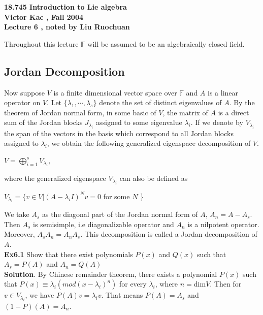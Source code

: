 \documentclass[12pt,a4paper]{article}
\begin{document}
\setlength{\baselineskip}{15pt}
\newtheorem{theorem}{Theorem}
\newtheorem{proposition}{Proposition}
\newtheorem{lemma}{Lemma}
\begin{center}
\textbf{18.745 Introduction to Lie algebra\\
Victor Kac , Fall 2004 \\
Lecture 6 , noted by Liu Ruochuan}
\end{center}

\noindent Throughout this lecture $\mathbb{F}$ will be assumed to
be an algebraically closed field.
\subsection*{Jordan Decomposition}
 Now suppose $V$ is a finite dimensional vector
space over $\mathbb{F}$ and $A$ is a linear operator on $V$. Let
$\{\lambda_{1},\cdots,\lambda_{s}\}$ denote the set of distinct
eigenvalues of $A$. By the theorem of Jordan normal form, in some
basic of $V$, the matrix of $A$ is a direct sum of the Jordan
blocks $J_{\lambda_{i}}$ assigned to some eigenvalue
$\lambda_{i}$. If we denote by $V_{\lambda_{i}}$ the span of the
vectors in the basis which correspond to all Jordan blocks
assigned to $\lambda_{i}$, we obtain the following generalized
eigenspace decomposition of $V$.
\begin{center}
 $V=\bigoplus_{i=1}^{s}V_{\lambda_{i}}$,
\end{center}
where the generalized eigenspace $V_{\lambda_{i}}$ can also be
defined as
\begin{center}
$V_{\lambda_{i}}=\{v\in V|(A-\lambda_{i}I)^{N}v=0$ for some $N$ \}
\end{center}
We take $A_{s}$ as the diagonal part of the Jordan normal form of
$A$, $A_{n}=A-A_{s}$. Then $A_{s}$ is semisimple, i.e
diagonalizable operator and $A_{n}$ is
a nilpotent operator. Moreover, $A_{s}A_{n}=A_{n}A_{s}$. This decomposition is called a Jordan decomposition of $A$. \\

\noindent \textbf{Ex6.1} Show that there exist polynomials $P(x)$
and $Q(x)$ such that $A_{s}=P(A)$ and $A_{n}=Q(A)$\\
\textbf{Solution}. By Chinese remainder theorem, there exists a
polynomial $P(x)$ such that
$P(x)\equiv\lambda_{i}(mod(x-\lambda_{i})^{n})$ for every
$\lambda_{i}$, where $n=$dim$V$. Then for $v\in V_{\lambda_{i}}$,
we have $P(A)v=\lambda_{i}v$. That means $P(A)=A_{s}$ and
$(1-P)(A)=A_{n}$.\\
\end{document}
